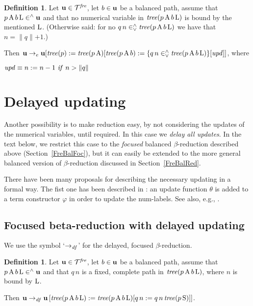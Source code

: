 \documentclass{article}
\theoremstyle{plain}
\theoremstyle{definition}
\newtheorem{Def}[The]{Definition}
\begin{document}
\begin{Def}
Let ${\bf u} \in {\cal T}^{\it fre}$, let $b \in {\bf u}$ be a balanced path, assume that $p \, {\rm A} \, b \, {\rm L} \in^\wedge {\bf u}$ and that no numerical variable in ${\it tree}(p \, {\rm A} \, b \, {\rm L})$ is bound by the mentioned ${\rm L}$. (Otherwise said: for no $q \, n \in^\wedge_\vee {\it tree}(p \, {\rm A} \, b \, {\rm L})$ we have that $n =  \lVert q \lVert  + 1$.)

\smallskip

Then ${\bf u} \rightarrow_e {\bf u} [{\it tree}(p) := {\it tree}(p \, {\rm A})[{\it tree}(p \, {\rm A} \, b) := \{q \, n \in^\wedge_\vee {\it tree}(p \, {\rm A} \, b \, {\rm L})\}[{\it upd}]]$, where

\smallskip

\hspace{1.5cm} ${\it upd} \equiv n := n - 1 ~{\it if\/}~n >  \lVert q \lVert $
\end{Def}


\section{Delayed updating}\label{SecDelUpd}

Another possibility is to make reduction easy, by not considering the updates of the numerical variables, until required. In this case we {\it delay all updates\/}. In the text below, we restrict this case to the {\it focused\/} balanced $\beta$-reduction described above (Section~\ref{FreBalFoc}), but it can easily be extended to the more general balanced version of $\beta$-reduction discussed in Section~\ref{FreBalRed}.

There have been many proposals for describing the necessary updating in a formal way. The fist one has been described in \citealp{deB78a}: an update function $\theta$ is added to a term constructor $\varphi$ in order to update the num-labels. See also, e.g., \citealp{Ven}.

\subsection{Focused beta-reduction with delayed updating}\label{SubSecDel}

We use the symbol `$\rightarrow_{\it df}$' for the delayed, focused $\beta$-reduction.

\begin{Def}\label{DefBetDel}
Let ${\bf u} \in {\cal T}^{\it fre}$, let $b \in {\bf u}$ be a balanced path, assume that $p \, {\rm A} \, b \, {\rm L} \in^\wedge {\bf u}$ and that $q \, n$ is a fixed, complete path in ${\it tree}(p \, {\rm A} \, b \, {\rm L})$, where $n$ is bound by ${\rm L}$.

\smallskip

Then ${\bf u} \rightarrow_{\it df} {\bf u} \, [{\it tree}(p \, {\rm A} \, b \, {\rm L}) := {\it tree}(p \, {\rm A} \, b \, {\rm L})[q \, n := q \, n \, {\it tree}(p \, {\rm S})]]$.
\end{Def}
\end{document}
